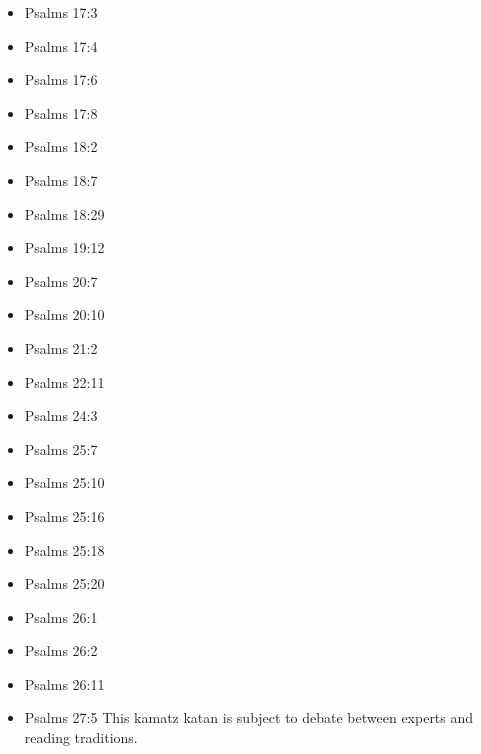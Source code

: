 \documentclass[14pt]{article}
\begin{document}
\begin{multicols}{2}
\begin{itemize}
\item Psalms 17:3

\item Psalms 17:4

\item Psalms 17:6

\item Psalms 17:8

\item Psalms 18:2

\item Psalms 18:7

\item Psalms 18:29

\item Psalms 19:12

\item Psalms 20:7

\item Psalms 20:10

\item Psalms 21:2

\item Psalms 22:11



\item Psalms 24:3

\item Psalms 25:7

\item Psalms 25:10

\item Psalms 25:16

\item Psalms 25:18

\item Psalms 25:20

\item Psalms 26:1

\item Psalms 26:2

\item Psalms 26:11

\item Psalms 27:5 This kamatz katan is subject to debate between experts and reading traditions.


\end{itemize}
\end{multicols}
\end{document}
